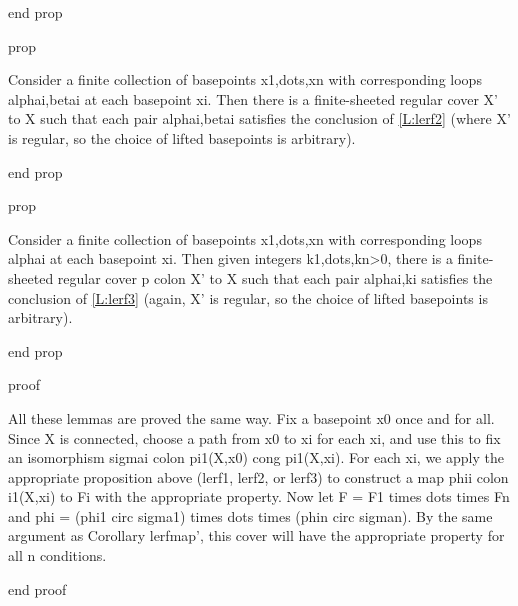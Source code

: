 end prop

prop

Consider a finite collection of basepoints x1,dots,xn with corresponding loops
alphai,betai at each basepoint xi. Then there is a finite-sheeted regular cover
X' to X such that each pair alphai,betai satisfies the conclusion of
\ref{L:lerf2} (where X' is regular, so the choice of lifted basepoints is
arbitrary).

end prop

prop

Consider a finite collection of basepoints x1,dots,xn with corresponding loops
alphai at each basepoint xi. Then given integers k1,dots,kn>0, there is
a finite-sheeted regular cover p colon X' to X such that each pair alphai,ki
satisfies the conclusion of \ref{L:lerf3} (again, X' is regular, so the choice
of lifted basepoints is arbitrary).

end prop

proof

All these lemmas are proved the same way. Fix a basepoint x0 once and for all.
Since X is connected, choose a path from x0 to xi for each xi, and use this to
fix an isomorphism sigmai colon pi1(X,x0) cong pi1(X,xi). For each xi, we apply
the appropriate proposition above (lerf1, lerf2, or lerf3) to construct a map
phii colon i1(X,xi) to Fi with the appropriate property. Now let F = F1 times
dots times Fn and phi = (phi1 circ sigma1) times dots times (phin circ sigman).
By the same argument as Corollary lerfmap', this cover will have the
appropriate property for all n conditions.

end proof
